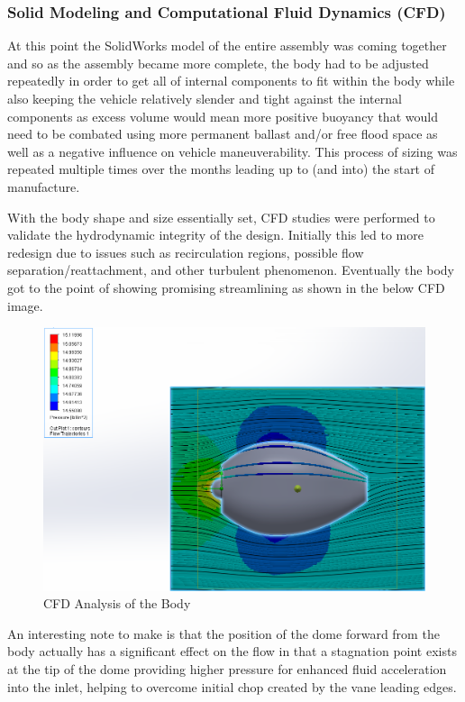 \documentclass{report}
\begin{document}
\subsubsection{Solid Modeling and Computational Fluid Dynamics (CFD)}
At this point the SolidWorks model of the entire assembly was coming together and so as the assembly became more complete, the body had to be adjusted repeatedly in order to get all of internal components to fit within the body while also keeping the vehicle relatively slender and tight against the internal components as excess volume would mean more positive buoyancy that would need to be combated using more permanent ballast and/or free flood space as well as a negative influence on vehicle maneuverability.  This process of sizing was repeated multiple times over the months leading up to (and into) the start of manufacture.\par
With the body shape and size essentially set, CFD studies were performed to validate the hydrodynamic integrity of the design.  Initially this led to more redesign due to issues such as recirculation regions, possible flow separation/reattachment, and other turbulent phenomenon.  Eventually the body got to the point of showing promising streamlining as shown in the below CFD image.
\begin{figure}[H]
\centering
\includegraphics[width=12cm]{cfdbody}
\caption{CFD Analysis of the Body}
\end{figure}
An interesting note to make is that the position of the dome forward from the body actually has a significant effect on the flow in that a stagnation point exists at the tip of the dome providing higher pressure for enhanced fluid acceleration into the inlet, helping to overcome initial chop created by the vane leading edges.
\end{document}
